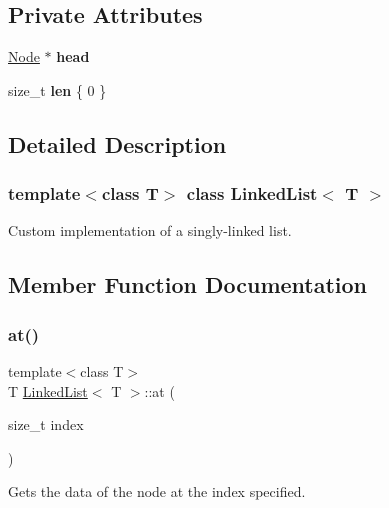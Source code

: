 \subsection*{Private Attributes}
\begin{DoxyCompactItemize}
\item 
\mbox{\label{classLinkedList_a2d1f848e19caa3f180b7fa6938125bba}} 
\hyperlink{structLinkedList_1_1Node}{Node} $\ast$ {\bfseries head}
\item 
\mbox{\label{classLinkedList_a61a7fe2947bd2d1dbf09a9a97bf7b3ce}} 
size\+\_\+t {\bfseries len} \{ 0 \}
\end{DoxyCompactItemize}


\subsection{Detailed Description}
\subsubsection*{template$<$class T$>$\newline
class Linked\+List$<$ T $>$}

Custom implementation of a singly-\/linked list. 

\subsection{Member Function Documentation}
\mbox{\label{classLinkedList_a2793ba03677f44075c0529dffe0b0d5a}} 
\subsubsection{\texorpdfstring{at()}{at()}}
{\footnotesize\ttfamily template$<$class T$>$ \\
T \hyperlink{classLinkedList}{Linked\+List}$<$ T $>$\+::at (\begin{DoxyParamCaption}\item[{size\+\_\+t}]{index }\end{DoxyParamCaption})\hspace{0.3cm}{\ttfamily [inline]}}



Gets the data of the node at the index specified. 


